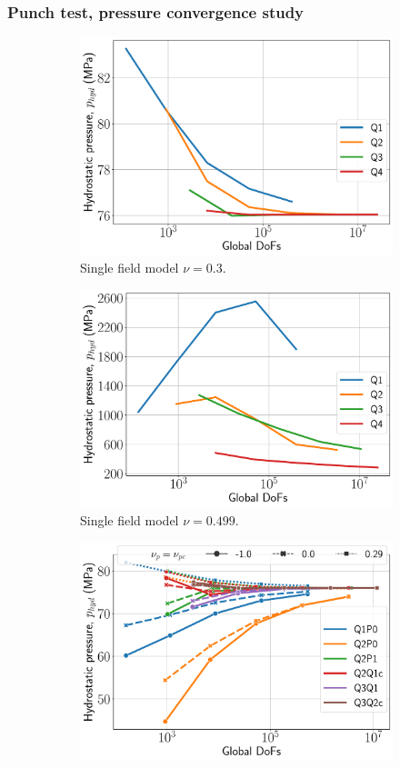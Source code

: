\documentclass{beamer}
\begin{document}
\begin{frame}
	\frametitle{Punch test, pressure convergence study}
	\begin{figure}[H]
		\begin{subfigure}{.5\textwidth}
			\centering
			\includegraphics[width=.8\textwidth]{../figs/p-punch2-iso-0.3.pdf}
			\caption{Single field model $\nu = 0.3$.}
		\end{subfigure}%
		\begin{subfigure}{.5\textwidth}
			\centering
			\includegraphics[width=.8\textwidth]{../figs/p-punch2-iso-0.499.pdf}
			\caption{Single field model $\nu = 0.499$.}
		\end{subfigure}
		\begin{subfigure}{.5\textwidth}
			\centering
			\includegraphics[width=.8\textwidth]{../figs/p-punch2-mixed-0.3.pdf}

\end{subfigure}
\end{figure}
\end{frame}
\end{document}
